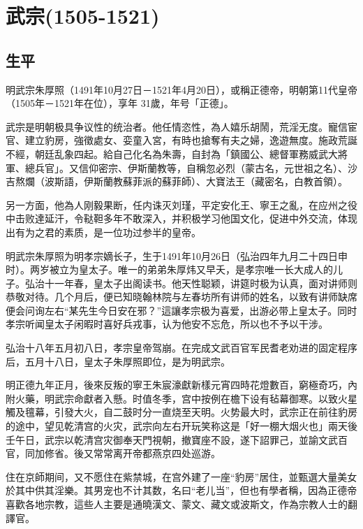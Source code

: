 
\section{武宗\tiny(1505-1521)}

\subsection{生平}

明武宗朱厚照（1491年10月27日－1521年4月20日），或稱正德帝，明朝第11代皇帝（1505年－1521年在位），享年 31歲，年号「正德」。

武宗是明朝极具争议性的统治者。他任情恣性，為人嬉乐胡鬧，荒淫无度。寵信宦官、建立豹房，強徵處女、娈童入宮，有時也搶奪有夫之婦，逸遊無度。施政荒誕不經，朝廷乱象四起。給自己化名為朱壽，自封為「鎮國公、總督軍務威武大將軍、總兵官」。又信仰密宗、伊斯蘭教等，自稱忽必烈（蒙古名，元世祖之名）、沙吉熬爛（波斯語，伊斯蘭教蘇菲派的蘇菲師）、大寶法王（藏密名，白教首領）。

另一方面，他為人刚毅果断，任内诛灭刘瑾，平定安化王、寧王之亂，在应州之役中击败達延汗，令鞑靼多年不敢深入，并积极学习他国文化，促进中外交流，体现出有为之君的素质，是一位功过参半的皇帝。

明武宗朱厚照为明孝宗嫡长子，生于1491年10月26日（弘治四年九月二十四日申时）。两岁被立为皇太子。唯一的弟弟朱厚炜又早夭，是孝宗唯一长大成人的儿子。弘治十一年春，皇太子出阁读书。他天性聪颖，讲筵时极为认真，面对讲师则恭敬对待。几个月后，便已知晓翰林院与左春坊所有讲师的姓名，以致有讲师缺席便会问询左右“某先生今日安在邪？”這讓孝宗极为喜爱，出游必带上皇太子。同时孝宗听闻皇太子闲暇时喜好兵戎事，认为他安不忘危，所以也不予以干涉。

弘治十八年五月初八日，孝宗皇帝驾崩。在完成文武百官军民耆老劝进的固定程序后，五月十八日，皇太子朱厚照即位，是为明武宗。

明正德九年正月，後來反叛的寧王朱宸濠獻新樣元宵四時花燈數百，窮極奇巧，內附火藥，明武宗命獻者入懸。时值冬季，宫中按例在檐下设有毡幕御寒。以致火星觸及氊幕，引發大火，自二鼓时分一直烧至天明。火势最大时，武宗正在前往豹房的途中，望见乾清宫的火灾，武宗向左右开玩笑称这是「好一棚大烟火也」兩天後壬午日，武宗以乾清宫灾御奉天門視朝，撤寶座不設，遂下詔罪己，並諭文武百官，同加修省。後又常常离开帝都燕京四处巡游。

住在京師期间，又不愿住在紫禁城，在宫外建了一座“豹房”居住，並甄選大量美女於其中供其淫樂。其男宠也不计其数，名曰“老儿当”，但也有學者稱，因為正德帝喜歡各地宗教，這些人主要是通曉漢文、蒙文、藏文或波斯文，作為宗教人士的翻譯官。

